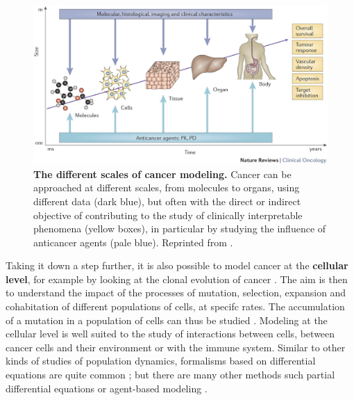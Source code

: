 \documentclass[a4paper,12pt,twoside,onecolumn,openright,final,oldfontcommands]{memoir}
\begin{document}
\begin{figure}

{\centering \includegraphics[width=0.9\linewidth]{fig/multiscale} 

}

\caption[The different scales of cancer modeling]{\textbf{The different scales of cancer
modeling.} Cancer can be approached at different scales, from molecules
to organs, using different data (dark blue), but often with the direct
or indirect objective of contributing to the study of clinically
interpretable phenomena (yellow boxes), in particular by studying the
influence of anticancer agents (pale blue). Reprinted from
\citet{barbolosi2016computational}.}\label{fig:multiscale}
\end{figure}









Taking it down a step further, it is also possible to model cancer at
the \textbf{cellular level}, for example by looking at the clonal
evolution of cancer \citep{altrock2015mathematics}. The aim is then to
understand the impact of the processes of mutation, selection, expansion
and cohabitation of different populations of cells, at specifc rates.
The accumulation of a mutation in a population of cells can thus be
studied \citep{bozic2010accumulation}. Modeling at the cellular level is
well suited to the study of interactions between cells, between cancer
cells and their environment or with the immune system. Similar to other
kinds of studies of population dynamics, formalisms based on
differential equations are quite common \citep{bellomo2008foundations};
but there are many other methods such partial differential equations or
agent-based modeling \citep{letort2019physiboss}.
\end{document}
